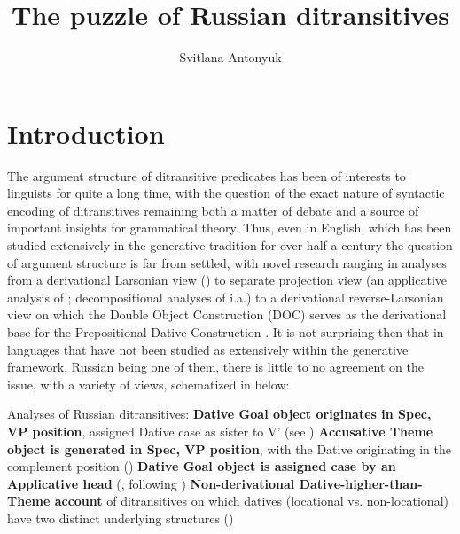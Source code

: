 \documentclass[output=paper,colorlinks,citecolor=brown,modfonts,nonflat]{langsci/langscibook}
\author{Svitlana Antonyuk	\affiliation{University of Connecticut}}
\title{The puzzle of Russian ditransitives}
\begin{document}
\maketitle





\section{Introduction}\label{sec:antonyuk:1}

The argument structure of ditransitive predicates has been of interests to linguists for quite a long time, with the question of the exact nature of syntactic encoding of ditransitives remaining both a matter of debate and a source of important insights for grammatical theory. Thus, even in English, which has been studied extensively in the generative tradition for over half a century the question of argument structure is far from settled, with novel research ranging in analyses from a derivational Larsonian view (\citealt{Larson1988, Larson2014}) to separate projection view (an applicative analysis of \citealt{Marantz1993}; decompositional analyses of \citealt{Pesetsky1995, Harley1995Diss, Harley2002} i.a.) to a derivational reverse-Larsonian view on which the Double Object Construction (DOC) serves as the derivational base for the Prepositional Dative Construction \citep{Hallman2015}. It is not surprising then that in languages that have not been studied as extensively within the generative framework, Russian being one of them, there is little to no agreement on the issue, with a variety of views, schematized in  below:

\ea%
    \label{ex:antonyuk:1}
    Analyses of Russian ditransitives:
    \ea \textbf{Dative Goal object originates in Spec, VP position}, assigned Dative case as sister to V’ (see \citealt{HarbertToribio1991, GreenbergFranks1991, Franks1995, Richardson2007})
    \ex \textbf{Accusative Theme object is generated in Spec, VP position}, with the Dative originating in the complement position (\citealt{Bailyn1995, Bailyn2010, Bailyn2012, Titov2017})
    \ex \textbf{Dative Goal object is assigned case by an Applicative head} (\citealt{Dyakonova2005, Dyakonova2009}, following \citealt{Pylkkänen2002})
    \ex \textbf{Non-derivational Dative-higher-than-Theme account} of ditransitives on which datives (locational vs. non-locational) have two distinct underlying structures (\citealt{BonehNash2017})
    \z
\z
\end{document}
